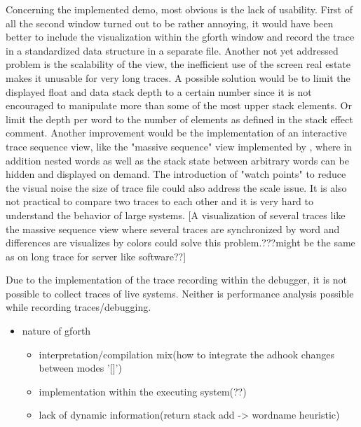 Concerning the implemented demo, most obvious is the lack of usability. First of all the second window turned out to be rather annoying, it would have been better to include the visualization within the gforth window and record the trace in a standardized data structure in a separate file.
Another not yet addressed problem is the scalability of the view, the inefficient use of the screen real estate makes it unusable for very long traces. A possible solution would be to limit the displayed float and data stack depth to a certain number since it is not encouraged to manipulate more than some of the most upper stack elements. Or limit the depth per word to the number of elements as defined in the stack effect comment. Another improvement would be the implementation of an interactive trace sequence view, like the "massive sequence" view implemented by \cite{Cornelissen:2008:ETA:1454787.1454981}, where in addition nested words as well as the stack state between arbitrary words can be hidden and displayed on demand. The introduction of "watch points" to reduce the visual noise the size of trace file could also address the scale issue.
It is also not practical to compare two traces to each other and it is very hard to understand the behavior of large systems. [A visualization of several traces like the massive sequence view where several traces are synchronized by word and differences are visualizes by colors could solve this problem.???might be the same as on long trace for server like software??]

Due to the implementation of the trace recording within the debugger, it is not possible to collect traces of live systems. Neither is performance analysis possible while recording traces/debugging.


\begin{itemize}
\item nature of gforth
	\begin{itemize}
	\item interpretation/compilation mix(how to integrate the adhook changes between modes '[]')
	\item implementation within the executing system(??)
	\item lack of dynamic information(return stack add -> wordname heuristic)
	\end{itemize}
\end{itemize}
